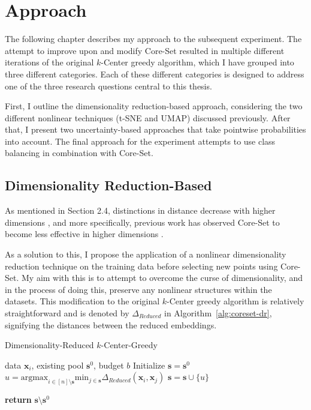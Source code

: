 \documentclass[english,bachelor,ul]{webisthesis} %
\begin{document}
\chapter{Approach}

The following chapter describes my approach to the subsequent experiment. The attempt to improve upon and modify Core-Set resulted in multiple different iterations of the original $k$-Center greedy algorithm, which I have grouped into three different categories. Each of these different categories is designed to address one of the three research questions central to this thesis. 

First, I outline the dimensionality reduction-based approach, considering the two different nonlinear techniques (t-SNE and UMAP) discussed previously. After that, I present two uncertainty-based approaches that take pointwise probabilities into account. The final approach for the experiment attempts to use class balancing in combination with Core-Set.

\section{Dimensionality Reduction-Based}

As mentioned in Section 2.4, distinctions in distance decrease with higher dimensions \citep{DBLP:conf/icdt/BeyerGRS99}, and more specifically, previous work has observed Core-Set to become less effective in higher dimensions \citep{DBLP:conf/iccv/SinhaED19}.

As a solution to this, I propose the application of a nonlinear dimensionality reduction technique on the training data before selecting new points using Core-Set. My aim with this is to attempt to overcome the curse of dimensionality, and in the process of doing this, preserve any nonlinear structures within the datasets. This modification to the original $k$-Center greedy algorithm is relatively straightforward and is denoted by $ \Delta_{Reduced} $ in Algorithm~\ref{alg:coreset-dr}, signifying the distances between the reduced embeddings.

\begin{algorithm}[htpb]
\caption{Dimensionality-Reduced $k$-Center-Greedy}%
\label{alg:coreset-dr}
\begin{algorithmic}


\Require data $ \mathbf{x}_i $, existing pool $ \mathbf{s}^0 $, budget $ b $
\State Initialize $ \mathbf{s} = \mathbf{s}^0 $
\Repeat
\State $ u = \text{argmax}_{i \in [n] \setminus \mathbf{s}} \text{min}_{j \in \mathbf{s}} \Delta_{Reduced}(\mathbf{x}_i, \mathbf{x}_j) $
\State $ \mathbf{s} = \mathbf{s} \cup \{u\} $

\State \textbf{return} $\mathbf{s} \setminus \mathbf{s}^0 $
\end{algorithmic}
\end{algorithm}
\end{document}
